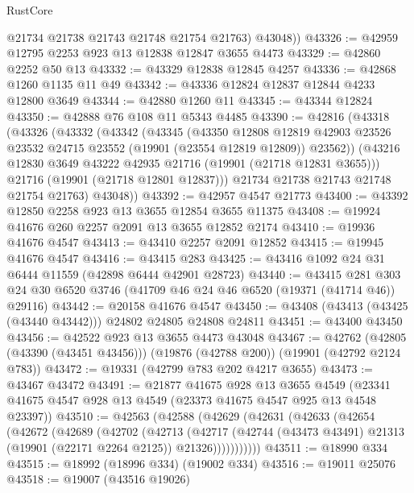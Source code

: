 \begin{lexlean}{RustCore}
\begin{coremodule}
          @21734
          @21738
          @21743
          @21748
          @21754
          @21763)
        @43048))
@43326 := @42959 @12795 @2253 @923 @13 @12838 @12847 @3655 @4473
@43329 := @42860 @2252 @50 @13
@43332 := @43329 @12838 @12845 @4257
@43336 := @42868 @1260 @1135 @11 @49
@43342 := @43336 @12824 @12837 @12844 @4233 @12800 @3649
@43344 := @42880 @1260 @11
@43345 := @43344 @12824
@43350 := @42888 @76 @108 @11 @5343 @4485
@43390 := @42816
    (@43318
      (@43326
        (@43332
          (@43342
            (@43345
              (@43350
                @12808
                @12819
                @42903
                @23526
                @23532
                @24715
                @23552
                (@19901 (@23554 @12819 @12809))
                @23562))
            (@43216 @12830 @3649 @43222 @42935 @21716 (@19901 (@21718 @12831 @3655)))
            @21716
            (@19901 (@21718 @12801 @12837)))
          @21734
          @21738
          @21743
          @21748
          @21754
          @21763)
        @43048))
@43392 := @42957 @4547 @21773
@43400 := @43392 @12850 @2258 @923 @13 @3655 @12854 @3655 @11375
@43408 := @19924 @41676 @260 @2257 @2091 @13 @3655 @12852 @2174
@43410 := @19936 @41676 @4547
@43413 := @43410 @2257 @2091 @12852
@43415 := @19945 @41676 @4547
@43416 := @43415 @283
@43425 := @43416 @1092 @24 @31 @6444 @11559 (@42898 @6444 @42901 @28723)
@43440 := @43415
    @281
    @303
    @24
    @30
    @6520
    @3746
    (@41709 @46 @24 @46 @6520 (@19371 (@41714 @46)) @29116)
@43442 := @20158 @41676 @4547
@43450 := @43408 (@43413 (@43425 (@43440 @43442))) @24802 @24805 @24808 @24811
@43451 := @43400 @43450
@43456 := @42522 @923 @13 @3655 @4473 @43048
@43467 := @42762
    (@42805 (@43390 (@43451 @43456)))
    (@19876 (@42788 @200))
    (@19901 (@42792 @2124 @783))
@43472 := @19331 (@42799 @783 @202 @4217 @3655)
@43473 := @43467 @43472
@43491 := @21877
    @41675
    @928
    @13
    @3655
    @4549
    (@23341 @41675 @4547 @928 @13 @4549 (@23373 @41675 @4547 @925 @13 @4548 @23397))
@43510 := @42563
    (@42588
      (@42629
        (@42631
          (@42633
            (@42654
              (@42672
                (@42689
                  (@42702
                    (@42713
                      (@42717
                        (@42744
                          (@43473 @43491)
                          @21313
                          (@19901 (@22171 @2264 @2125))
                          @21326)))))))))))
@43511 := @18990 @334
@43515 := @18992 (@18996 @334) (@19002 @334)
@43516 := @19011 @25076
@43518 := @19007 (@43516 @19026)

\end{coremodule}
\end{lexlean}
